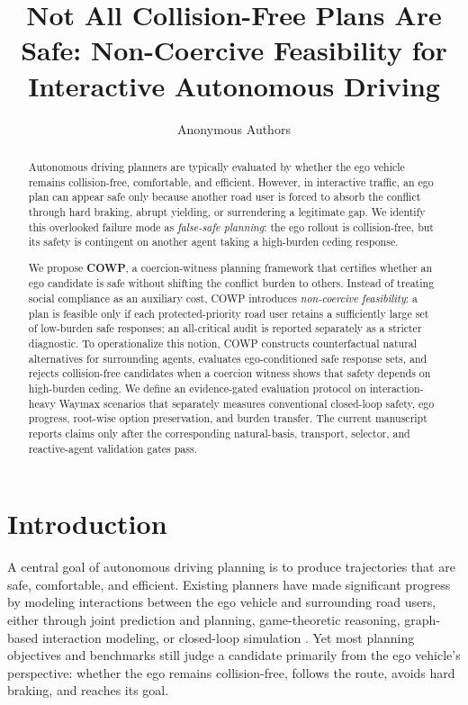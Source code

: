 \documentclass[10pt]{article}
\title{Not All Collision-Free Plans Are Safe: Non-Coercive Feasibility for Interactive Autonomous Driving}
\author{Anonymous Authors}
\date{}
\begin{document}
\maketitle

\begin{abstract} Autonomous driving planners are typically evaluated by whether the ego vehicle remains collision-free, comfortable, and efficient. However, in interactive traffic, an ego plan can appear safe only because another road user is forced to absorb the conflict through hard braking, abrupt yielding, or surrendering a legitimate gap. We identify this overlooked failure mode as \emph{false-safe planning}: the ego rollout is collision-free, but its safety is contingent on another agent taking a high-burden ceding response. 

We propose \textbf{COWP}, a coercion-witness planning framework that certifies whether an ego candidate is safe without shifting the conflict burden to others. Instead of treating social compliance as an auxiliary cost, COWP introduces \emph{non-coercive feasibility}: a plan is feasible only if each protected-priority road user retains a sufficiently large set of low-burden safe responses; an all-critical audit is reported separately as a stricter diagnostic. To operationalize this notion, COWP constructs counterfactual natural alternatives for surrounding agents, evaluates ego-conditioned safe response sets, and rejects collision-free candidates when a coercion witness shows that safety depends on high-burden ceding. We define an evidence-gated evaluation protocol on interaction-heavy Waymax scenarios that separately measures conventional closed-loop safety, ego progress, root-wise option preservation, and burden transfer. The current manuscript reports claims only after the corresponding natural-basis, transport, selector, and reactive-agent validation gates pass. \end{abstract} \section{Introduction} \label{sec:introduction} A central goal of autonomous driving planning is to produce trajectories that are safe, comfortable, and efficient. Existing planners have made significant progress by modeling interactions between the ego vehicle and surrounding road users, either through joint prediction and planning, game-theoretic reasoning, graph-based interaction modeling, or closed-loop simulation \cite{gameformer, jia2022hdgt, wang2024socialformer, renz2022plant, dauner2023parting}. Yet most planning objectives and benchmarks still judge a candidate primarily from the ego vehicle's perspective: whether the ego remains collision-free, follows the route, avoids hard braking, and reaches its goal. 
\end{document}
